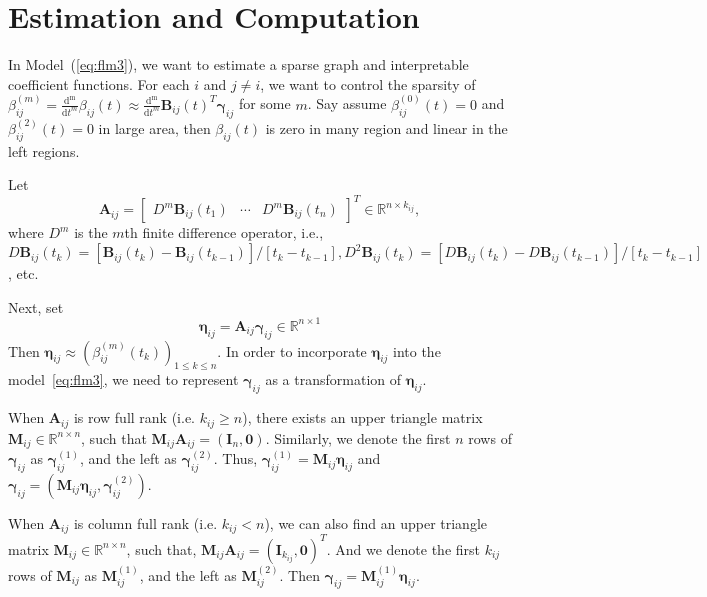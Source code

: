 \documentclass[11pt]{article}
\newcommand{\R}{\mathbb R}
\newcommand{\bA}{\mathbf A}
\newcommand{\bB}{\mathbf B}
\newcommand{\bM}{\mathbf M}
\newcommand{\bI}{\mathbf I}
\newcommand{\bseta}{\boldsymbol{\eta}}
\newcommand{\bgamma}{\boldsymbol{\gamma}}
\begin{document}
\section{Estimation and Computation}

In Model~(\ref{eq:flm3}), we want to estimate a sparse graph and interpretable coefficient functions. For each $i$ and $j \neq i$, we want to control the sparsity of $ \beta_{ij}^{(m)} = \frac{\mathrm{d^m}}{\mathrm{d} t^m} \beta_{ij}(t) \approx \frac{\mathrm{d^m}}{\mathrm{d} t^m} \bB_{ij}(t)^T \bgamma_{ij}$ for some $m$. Say assume $\beta_{ij}^{(0)}(t) = 0$ and $\beta_{ij}^{(2)}(t) = 0$ in large area, then $\beta_{ij}(t)$ is zero in many region and linear in the left regions.

Let 
\begin{equation}
	\bA_{ij} = \begin{bmatrix} D^m\bB_{ij}(t_1) & \cdots & D^m\bB_{ij}(t_n) \end{bmatrix}^T \in \R^{n \times k_{ij}},
\end{equation} 
where $D^m$ is the $m$th finite difference operator, i.e., $D\bB_{ij}(t_k) = [\bB_{ij}(t_k) - \bB_{ij}(t_{k-1})]/[t_k - t_{k-1}], D^2\bB_{ij}(t_k) = [D\bB_{ij}(t_k) - D\bB_{ij}(t_{k-1})]/[t_k - t_{k-1}]$, etc. 

Next, set
\begin{equation}
	\bseta_{ij} = \bA_{ij} \bgamma_{ij} \in \R^{n \times 1}  
\end{equation}
Then $\bseta_{ij} \approx (\beta_{ij}^{(m)}(t_k))_{1 \leq k \leq n}$. In order to incorporate $\bseta_{ij}$ into the model~\ref{eq:flm3}, we need to represent $\bgamma_{ij}$ as a transformation of $\bseta_{ij}$. 

When $\bA_{ij}$ is row full rank (i.e. $k_{ij} \geq n$), there exists an upper triangle matrix $\bM_{ij} \in \R^{n \times n}$, such that $\bM_{ij} \bA_{ij} = (\bI_n, \mathbf{0})$. Similarly, we denote the first $n$ rows of $\bgamma_{ij}$ as $\bgamma_{ij}^{(1)}$, and the left as $\bgamma_{ij}^{(2)}$. Thus, $\bgamma_{ij}^{(1)} = \bM_{ij} \bseta_{ij}$ and $\bgamma_{ij} = (\bM_{ij} \bseta_{ij}, \bgamma_{ij}^{(2)})$. 

When $\bA_{ij}$ is column full rank (i.e. $k_{ij} < n$), we can also find an upper triangle matrix $\bM_{ij} \in \R^{n \times n}$, such that, $\bM_{ij} \bA_{ij} = (\bI_{k_{ij}}, \mathbf{0})^T$. And we denote the first $k_{ij}$ rows of $\bM_{ij}$ as $\bM_{ij}^{(1)}$, and the left as $\bM_{ij}^{(2)}$. Then $\bgamma_{ij} = \bM_{ij}^{(1)}\bseta_{ij}$.
\end{document}
